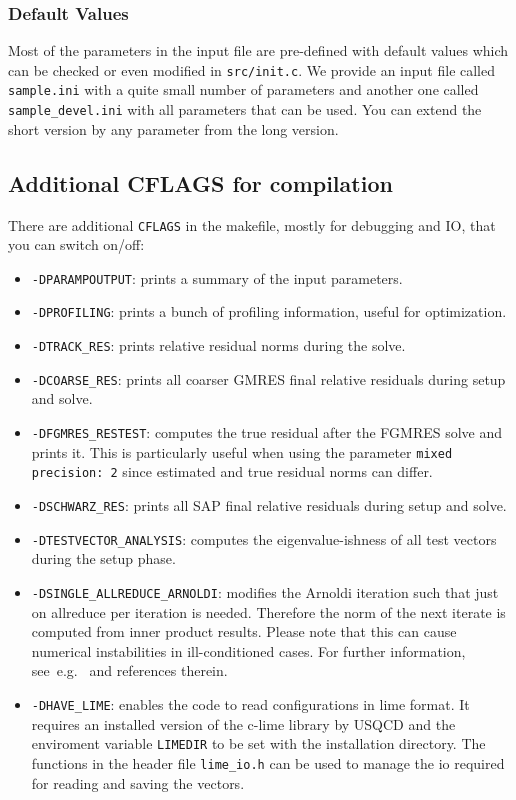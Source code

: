 \documentclass[a4paper,12pt]{scrartcl}
\begin{document}
\subsubsection{Default Values}
Most of the parameters in the input file are pre-defined with default values which can be checked or even modified in \texttt{src/init.c}. We provide an input file called \texttt{sample.ini} with a quite small number of parameters and another one called \texttt{sample\_devel.ini} with all parameters that can be used. You can extend the short version by any parameter from the long version.

\subsection{Additional CFLAGS for compilation} \label{additionalcflags}
There are additional \texttt{CFLAGS} in the makefile, mostly for debugging and IO, that you can switch on/off:
\begin{itemize}
  \item \texttt{-DPARAMPOUTPUT}: prints a summary of the input parameters.
  \item \texttt{-DPROFILING}: prints a bunch of profiling information, useful for optimization.
  \item \texttt{-DTRACK\_RES}: prints relative residual norms during the solve. 
  \item \texttt{-DCOARSE\_RES}: prints all coarser GMRES final relative residuals during setup and solve.
  \item \texttt{-DFGMRES\_RESTEST}: computes the true residual after the FGMRES solve and prints it. This is particularly useful when using the parameter \texttt{mixed precision: 2} since estimated and true residual norms can differ.
  \item \texttt{-DSCHWARZ\_RES}: prints all SAP final relative residuals during setup and solve.
  \item \texttt{-DTESTVECTOR\_ANALYSIS}: computes the eigenvalue-ishness of all test vectors during the setup phase.
  \item \texttt{-DSINGLE\_ALLREDUCE\_ARNOLDI}: modifies the Arnoldi iteration such that just on allreduce per iteration is needed. Therefore the norm of the next iterate is computed from inner product results. Please note that this can cause numerical instabilities in ill-conditioned cases. For further information, see~e.g.~\cite{RottmannPhD} and references therein.
  \item \texttt{-DHAVE\_LIME}: enables the code to read configurations in lime format. It requires an installed version of the c-lime library by USQCD and the enviroment variable \texttt{LIMEDIR} to be set with the installation directory. The functions in the header file \texttt{lime\_io.h} can be used to manage the io required for reading and saving the vectors.
\end{itemize}
\end{document}
